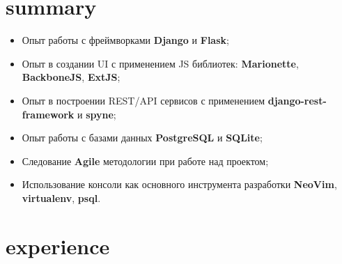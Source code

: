 \documentclass[]{cv-style}
\begin{document}
\section{summary}

\begin{itemize}
    \item Опыт работы с фреймворками \textbf{Django} и \textbf{Flask};
    \item Опыт в создании UI с применением JS библиотек: \textbf{Marionette}, \textbf{BackboneJS}, \textbf{ExtJS};
    \item Опыт в построении REST/API сервисов с применением \textbf{django-rest-framework} и \textbf{spyne};
    \item Опыт работы с базами данных \textbf{PostgreSQL} и \textbf{SQLite};
    \item Следование \textbf{Agile} методологии при работе над проектом;
    \item Использование консоли как основного инструмента разработки \textbf{NeoVim}, \textbf{virtualenv}, \textbf{psql}.
\end{itemize}

\section{experience}
\end{document}
